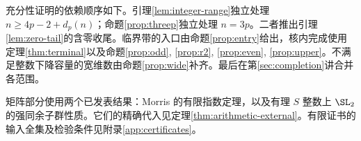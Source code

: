 充分性证明的依赖顺序如下。引理\ref{lem:integer-range}独立处理 $n\ge4p-2+d_p(n)$；命题\ref{prop:threep}独立处理 $n=3p$。二者推出引理\ref{lem:zero-tail}的含零收尾。临界带的入口由命题\ref{prop:entry}给出，核内完成使用定理\ref{thm:terminal}以及命题\ref{prop:odd}, \ref{prop:r2}, \ref{prop:even}, \ref{prop:upper}。不满足整数下降容量的宽维数由命题\ref{prop:wide}补齐。最后在第\ref{sec:completion}讲合并各范围。

矩阵部分使用两个已发表结果：Morris 的有限指数定理\cite[Theorem 6.1(2)]{morris}，以及有理 $S$ 整数上 $\SL_2$ 的强同余子群性质\cite{serre,prasad}。它们的精确代入见定理\ref{thm:arithmetic-external}。有限证书的输入全集及检验条件见附录\ref{app:certificates}。

